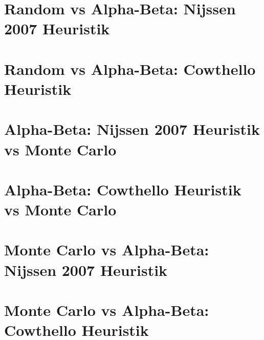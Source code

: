 \section{Random vs Alpha-Beta: Nijssen 2007 Heuristik}

\section{Random vs Alpha-Beta: Cowthello Heuristik}

\section{Alpha-Beta: Nijssen 2007 Heuristik vs Monte Carlo}

\section{Alpha-Beta: Cowthello Heuristik vs Monte Carlo}

\section{Monte Carlo vs Alpha-Beta: Nijssen 2007 Heuristik}

\section{Monte Carlo vs Alpha-Beta: Cowthello Heuristik}
